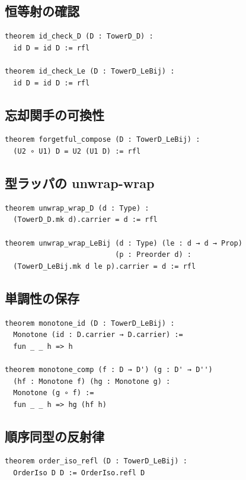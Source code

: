 \documentclass[a4paper,12pt]{ltjsarticle}
\theoremstyle{definition}
\begin{document}
\subsection{恒等射の確認}

\begin{verbatim}
theorem id_check_D (D : TowerD_D) :
  id D = id D := rfl

theorem id_check_Le (D : TowerD_LeBij) :
  id D = id D := rfl
\end{verbatim}

\subsection{忘却関手の可換性}

\begin{verbatim}
theorem forgetful_compose (D : TowerD_LeBij) :
  (U2 ∘ U1) D = U2 (U1 D) := rfl
\end{verbatim}

\subsection{型ラッパの unwrap-wrap}

\begin{verbatim}
theorem unwrap_wrap_D (d : Type) :
  (TowerD_D.mk d).carrier = d := rfl

theorem unwrap_wrap_LeBij (d : Type) (le : d → d → Prop)
                          (p : Preorder d) :
  (TowerD_LeBij.mk d le p).carrier = d := rfl
\end{verbatim}

\subsection{単調性の保存}

\begin{verbatim}
theorem monotone_id (D : TowerD_LeBij) :
  Monotone (id : D.carrier → D.carrier) :=
  fun _ _ h => h

theorem monotone_comp (f : D → D') (g : D' → D'')
  (hf : Monotone f) (hg : Monotone g) :
  Monotone (g ∘ f) :=
  fun _ _ h => hg (hf h)
\end{verbatim}

\subsection{順序同型の反射律}

\begin{verbatim}
theorem order_iso_refl (D : TowerD_LeBij) :
  OrderIso D D := OrderIso.refl D
\end{verbatim}
\end{document}
